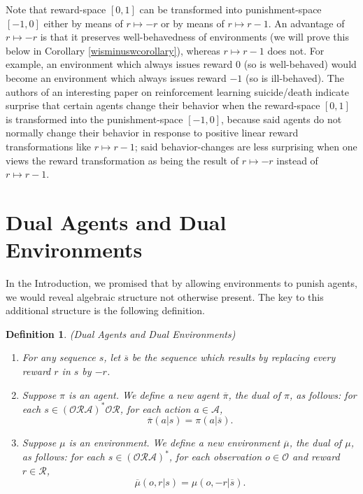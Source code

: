 \documentclass{article}
\newtheorem{definition}[theorem]{Definition}
\begin{document}
Note that reward-space $[0,1]$ can be transformed into punishment-space
$[-1,0]$ either by means of $r\mapsto -r$ or by means of $r\mapsto r-1$.
An advantage of $r\mapsto -r$ is that it preserves well-behavedness of
environments (we will prove this below in Corollary \ref{wisminuswcorollary}),
whereas $r\mapsto r-1$ does not. For example, an environment which always
issues reward $0$ (so is well-behaved)
would become an environment which always issues reward $-1$ (so is ill-behaved).
The authors of an interesting paper on reinforcement learning suicide/death
\cite{martin2016death} indicate surprise that certain agents change their behavior
when the reward-space $[0,1]$ is transformed into the punishment-space $[-1,0]$,
because said agents do not normally change their behavior in response to positive
linear reward transformations like $r\mapsto r-1$; said behavior-changes are
less surprising when one views the reward transformation as being the result of
$r\mapsto -r$ instead of $r\mapsto r-1$.

\section{Dual Agents and Dual Environments}
\label{dualsection}

In the Introduction, we promised that by allowing environments to punish agents,
we would reveal algebraic structure not otherwise present. The key to this additional
structure is the following definition.

\begin{definition}
(Dual Agents and Dual Environments)
\begin{enumerate}
    \item
    For any sequence $s$, let $\overline s$ be the sequence which results
    by replacing every reward $r$ in $s$ by $-r$.
    \item
    Suppose $\pi$ is an agent.
    We define a new agent $\overline \pi$, the \emph{dual} of $\pi$,
    as follows:
    for each $s\in (\mathcal O\mathcal R\mathcal A)^*\mathcal O\mathcal R$,
    for each action $a\in\mathcal A$,
    \[\overline\pi(a|s)=\pi(a|\overline s).\]
    \item
    Suppose $\mu$ is an environment.
    We define a new environment $\overline\mu$, the \emph{dual} of $\mu$,
    as follows:
    for each $s\in (\mathcal O\mathcal R\mathcal A)^*$,
    for each observation $o\in\mathcal O$
    and reward $r\in\mathcal R$,
    \[\overline\mu(o,r|s)=\mu(o,-r|\overline s).\]
\end{enumerate}
\end{definition}
\end{document}
